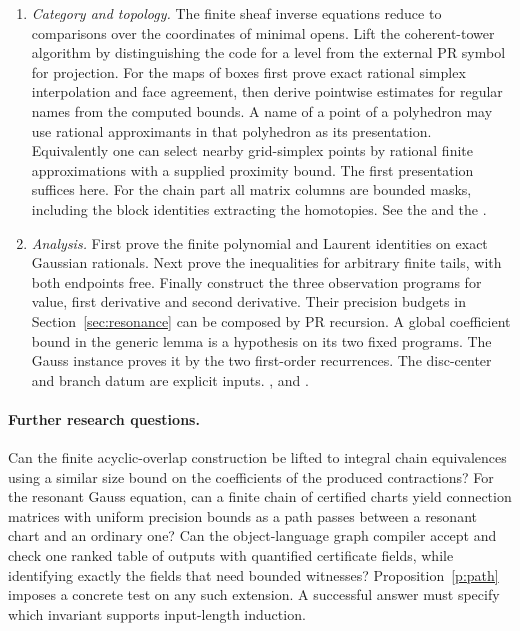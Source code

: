 \begin{enumerate}
\item \emph{Category and topology.} The finite sheaf inverse equations reduce to comparisons over the coordinates of minimal opens. Lift the coherent-tower algorithm by distinguishing the code for a level from the external PR symbol for projection. For the maps of boxes first prove exact rational simplex interpolation and face agreement, then derive pointwise estimates for regular names from the computed bounds. A name of a point of a polyhedron may use rational approximants in that polyhedron as its presentation. Equivalently one can select nearby grid-simplex points by rational finite approximations with a supplied proximity bound. The first presentation suffices here. For the chain part all matrix columns are bounded masks, including the block identities extracting the homotopies. See the  and the .
\item \emph{Analysis.} First prove the finite polynomial and Laurent identities on exact Gaussian rationals. Next prove the inequalities for arbitrary finite tails, with both endpoints free. Finally construct the three observation programs for value, first derivative and second derivative. Their precision budgets in Section~\ref{sec:resonance} can be composed by PR recursion. A global coefficient bound in the generic lemma is a hypothesis on its two fixed programs. The Gauss instance proves it by the two first-order recurrences. The disc-center and branch datum are explicit inputs. ,  and .
\end{enumerate}

\paragraph{Further research questions.}
Can the finite acyclic-overlap construction be lifted to integral chain equivalences using a similar size bound on the coefficients of the produced contractions? For the resonant Gauss equation, can a finite chain of certified charts yield connection matrices with uniform precision bounds as a path passes between a resonant chart and an ordinary one? Can the object-language graph compiler accept and check one ranked table of outputs with quantified certificate fields, while identifying exactly the fields that need bounded witnesses? Proposition~\ref{p:path} imposes a concrete test on any such extension. A successful answer must specify which invariant supports input-length induction.


